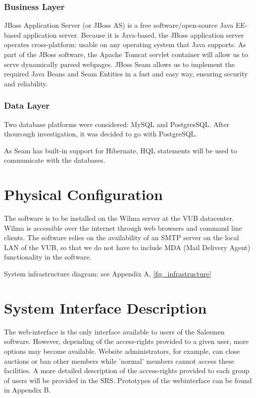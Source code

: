 \documentclass[a4paper, 12pt]{report}
\begin{document}
\subsubsection{Business Layer}
JBoss Application Server (or JBoss AS) is a free software/open-source Java EE-based application server. Because it is Java-based, the JBoss application server operates cross-platform: usable on any operating system that Java supports. 
As part of the JBoss software, the Apache Tomcat servlet container will allow us to serve dynamically parsed webpages.
JBoss Seam allows us to implement the required Java Beans and Seam Entities in a fast and easy way, ensuring security and reliability.

\subsubsection{Data Layer}
Two database platforms were considered: MySQL and PostgresSQL.
After thourough investigation, it was decided to go with PostgreSQL.

As Seam has built-in support for Hibernate, HQL statements will be used to communicate with the databases. 


\section{Physical Configuration}
The software is to be installed on the Wilma server at the VUB datacenter. Wilma is accessible over the internet through web browsers and command line clients. The software relies on the availability of an SMTP server on the local LAN of the VUB, so that we do not have to include MDA (Mail Delivery Agent) functionality in the software.

System infrastructure diagram: see Appendix A, \ref{fig_infrastructure}


\section{System Interface Description}
The web-interface is the only interface available to users of the Salesmen software. However, depending of the access-rights provided to a given user, more options may become available. Website administrators, for example, can close auctions or ban other members while 'normal' members cannot access these facilities. A more detailed description of the access-rights provided to each group of users will be provided in the SRS.
Prototypes of the webinterface can be found in Appendix B.
\pagebreak
\end{document}
